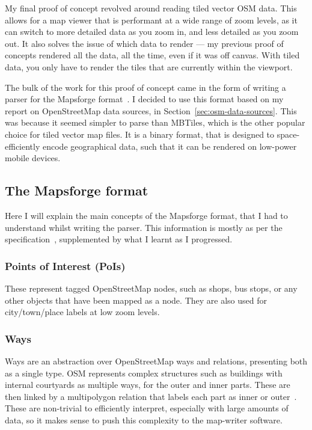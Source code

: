 \documentclass[hyphens]{final_report}
\begin{document}
My final proof of concept revolved around reading tiled vector OSM data. This allows for a map viewer that is performant at a wide range of zoom levels, as it can switch to more detailed data as you zoom in, and less detailed as you zoom out. It also solves the issue of which data to render --- my previous proof of concepts rendered all the data, all the time, even if it was off canvas. With tiled data, you only have to render the tiles that are currently within the viewport.

The bulk of the work for this proof of concept came in the form of writing a parser for the Mapsforge format~\cite{mapsforge-format}. I decided to use this format based on my report on OpenStreetMap data sources, in Section~\ref{sec:osm-data-sources}. This was because it seemed simpler to parse than MBTiles, which is the other popular choice for tiled vector map files. It is a binary format, that is designed to space-efficiently encode geographical data, such that it can be rendered on low-power mobile devices.

\subsection{The Mapsforge format}

Here I will explain the main concepts of the Mapsforge format, that I had to understand whilst writing the parser. This information is mostly as per the specification~\cite{mapsforge-format}, supplemented by what I learnt as I progressed.

\subsubsection{Points of Interest (PoIs)}

These represent tagged OpenStreetMap nodes, such as shops, bus stops, or any other objects that have been mapped as a node. They are also used for city/town/place labels at low zoom levels.

\subsubsection{Ways}

Ways are an abstraction over OpenStreetMap ways and relations, presenting both as a single type. OSM represents complex structures such as buildings with internal courtyards as multiple ways, for the outer and inner parts. These are then linked by a multipolygon relation that labels each part as inner or outer~\cite{osm-wiki-multipolygon}. These are non-trivial to efficiently interpret, especially with large amounts of data, so it makes sense to push this complexity to the map-writer software.
\end{document}
